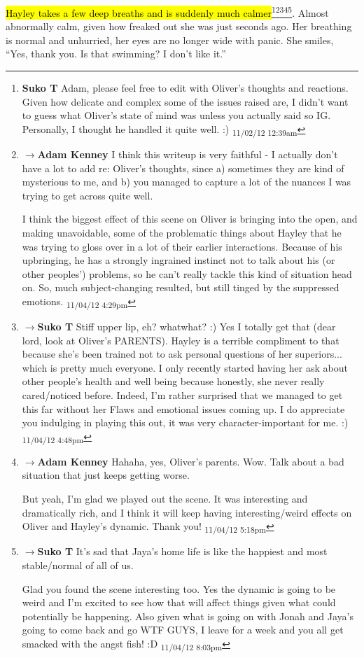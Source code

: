 \hl{Hayley takes a few deep breaths and is suddenly much calmer}\footnote{\textbf{Suko T }Adam, please feel free to edit with Oliver's thoughts and reactions.  Given how delicate and complex some of the issues raised are, I didn't want to guess what Oliver's state of mind was unless you actually said so IG.  Personally, I thought he handled it quite well. :) \textsubscript{11/02/12 12:39am}}\footnote{$\rightarrow$\textbf{Adam Kenney }I think this writeup is very faithful - I actually don't have a lot to add re: Oliver's thoughts, since a) sometimes they are kind of mysterious to me, and b) you managed to capture a lot of the nuances I was trying to get across quite well.

I think the biggest effect of this scene on Oliver is bringing into the open, and making unavoidable, some of the problematic things about Hayley that he was trying to gloss over in a lot of their earlier interactions.  Because of his upbringing, he has a strongly ingrained instinct not to talk about his (or other peoples') problems, so he can't really tackle this kind of situation head on.  So, much subject-changing resulted, but still tinged by the suppressed emotions. \textsubscript{11/04/12 4:29pm}}\footnote{$\rightarrow$\textbf{Suko T }Stiff upper lip, eh?  whatwhat?  :)  Yes I totally get that (dear lord, look at Oliver's PARENTS).  Hayley is a terrible compliment to that because she's been trained not to ask personal questions of her superiors... which is pretty much everyone. I only recently started having her ask about other people's health and well being because honestly, she never really cared/noticed before.  Indeed, I'm rather surprised that we managed to get this far without her Flaws and emotional issues coming up.  I do appreciate you indulging in playing this out, it was very character-important for me. :) \textsubscript{11/04/12 4:48pm}}\footnote{$\rightarrow$\textbf{Adam Kenney }Hahaha, yes, Oliver's parents.  Wow.  Talk about a bad situation that just keeps getting worse.

But yeah, I'm glad we played out the scene.  It was interesting and dramatically rich, and I think it will keep having interesting/weird effects on Oliver and Hayley's dynamic.  Thank you! \textsubscript{11/04/12 5:18pm}}\footnote{$\rightarrow$\textbf{Suko T }It's sad that Jaya's home life is like the happiest and most stable/normal of all of us.  

Glad you found the scene interesting too. Yes the dynamic is going to be weird and I'm excited to see how that will affect things given what could potentially be happening.  Also given what is going on with Jonah and Jaya's going to come back and go WTF GUYS, I leave for a week and you all get smacked with the angst fish! :D \textsubscript{11/04/12 8:03pm}}.  Almost abnormally calm, given how freaked out she was just seconds ago.  Her breathing is normal and unhurried, her eyes are no longer wide with panic.  She smiles, ``Yes, thank you.  Is that swimming?  I don't like it.''



